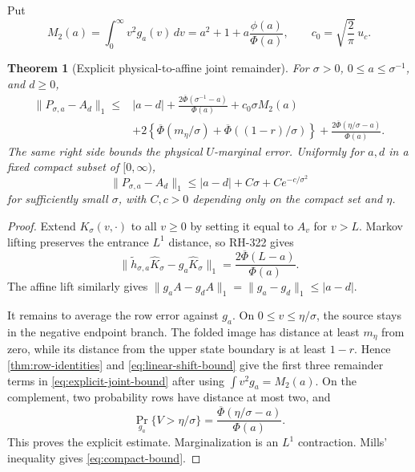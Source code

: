 \documentclass[11pt]{article}
\newtheorem{theorem}{Theorem}[section]
\theoremstyle{remark}
\begin{document}
Put
\begin{equation}\label{eq:second-moment}
 M_2(a)=\int_0^\infty v^2g_a(v)\,dv
 =a^2+1+a\frac{\phi(a)}{\Phi(a)},
 \qquad
 c_0=\sqrt{\frac2\pi}\,u_c.
\end{equation}

\begin{theorem}[Explicit physical-to-affine joint remainder]
\label{thm:joint-bound}
For $\sigma>0$, $0\le a\le\sigma^{-1}$, and $d\ge0$,
\begin{align}
 \|P_{\sigma,a}-A_d\|_1
 \le{}& |a-d|
 +\frac{2\overline\Phi(\sigma^{-1}-a)}{\Phi(a)}
 +c_0\sigma M_2(a)
 \nonumber\\
 &+2\left\{
 \overline\Phi(m_\eta/\sigma)
 +\overline\Phi((1-r)/\sigma)
 \right\}
 +\frac{2\overline\Phi(\eta/\sigma-a)}{\Phi(a)}.
 \label{eq:explicit-joint-bound}
\end{align}
The same right side bounds the physical $U$-marginal error.  Uniformly for
$a,d$ in a fixed compact subset of $[0,\infty)$,
\begin{equation}\label{eq:compact-bound}
 \|P_{\sigma,a}-A_d\|_1
 \le |a-d|+C\sigma+Ce^{-c/\sigma^2}
\end{equation}
for sufficiently small $\sigma$, with $C,c>0$ depending only on the compact
set and $\eta$.
\end{theorem}

\begin{proof}
Extend $K_\sigma(v,\cdot)$ to all $v\ge0$ by setting it equal to $A_v$ for
$v>L$.  Markov lifting preserves the entrance $L^1$ distance, so RH-322 gives
\[
 \|\widetilde h_{\sigma,a}\widehat K_\sigma
      -g_a\widehat K_\sigma\|_1
 =\frac{2\overline\Phi(L-a)}{\Phi(a)}.
\]
The affine lift similarly gives
$\|g_aA-g_dA\|_1=\|g_a-g_d\|_1\le|a-d|$.

It remains to average the row error against $g_a$.  On
$0\le v\le\eta/\sigma$, the source stays in the negative endpoint branch.
The folded image has distance at least $m_\eta$ from zero, while its distance
from the upper state boundary is at least $1-r$.  Hence
\cref{thm:row-identities} and \eqref{eq:linear-shift-bound} give the first
three remainder terms in \eqref{eq:explicit-joint-bound} after using
$\int v^2g_a=M_2(a)$.  On the complement, two probability rows have distance
at most two, and
\[
 \Pr_{g_a}\{V>\eta/\sigma\}
 =\frac{\overline\Phi(\eta/\sigma-a)}{\Phi(a)}.
\]
This proves the explicit estimate.  Marginalization is an $L^1$ contraction.
Mills' inequality gives \eqref{eq:compact-bound}.
\end{proof}
\end{document}
